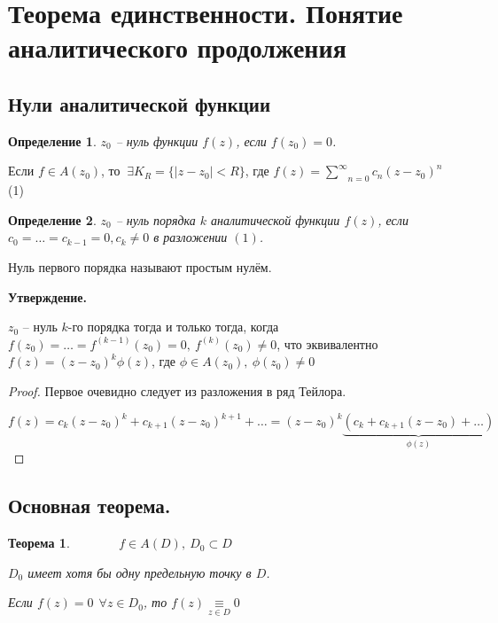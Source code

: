\documentclass[draft]{article}
\newcommand{\forcenewline}{$\phantom{\mbox{newline}}$\newline}
\newcommand{\msum}[2]{\underset{#1}{\overset{#2}{\sum}}}
\newcommand{\ssum}{\msum{n=0}{\infty}}
\renewcommand{\f}{\phi}
\newcommand{\E}{\ \exists}
\newcommand{\F}{\ \forall}
\newcommand{\opr}[1]{\begin{opred}#1\end{opred}}
\newtheorem*{theor}{Теорема}
\newtheorem*{opred}{Определение}
\theoremstyle{remark}
\begin{document}
\newpage

\section{Теорема единственности. Понятие аналитического продолжения}

\subsection{Нули аналитической функции}

\opr{$z_0$ -- нуль функции $f(z)$, если $f(z_0)=0$.}

Если $f\in A(z_0)$, то $\E K_R=\{|z-z_0|<R\}$, где $f(z)=\ssum c_n(z-z_0)^n$ (1)

\opr{$z_0$ -- нуль порядка $k$ аналитической функции $f(z)$, если $c_0=\ldots=c_{k-1}=0,c_k\neq0$ в разложении $(1)$.}

Нуль первого порядка называют простым нулём.

{\bfseries Утверждение.}

$z_0$ -- нуль $k$-го порядка тогда и только тогда, когда $f(z_0)=\ldots=f^{(k-1)}(z_0)=0,\ f^{(k)}(z_0)\neq 0$, что эквивалентно $f(z)=(z-z_0)^k\f(z)$, где $\f\in A(z_0),\ \f(z_0)\neq0$
\begin{proof}
Первое очевидно следует из разложения в ряд Тейлора.

$f(z)=c_k(z-z_0)^k+c_{k+1}(z-z_0)^{k+1}+\ldots=(z-z_0)^k\underset{\f(z)}{\underbrace{(c_k+c_{k+1}(z-z_0)+\ldots)}}$
\end{proof}

\subsection{Основная теорема.}

\begin{theor}
\forcenewline
$f\in A(D),\ D_0\subset D$

$D_0$ имеет хотя бы одну предельную точку в $D$.

Если $f(z)=0\ \F z\in D_0$, то $f(z)\underset{z\in D}{\equiv}0$
\end{theor}
\end{document}
